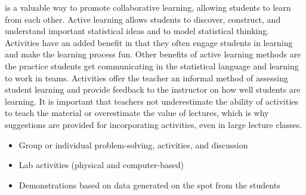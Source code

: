 \documentclass[twoside,openany]{tufte-book}
\begin{document}
 is a valuable way to promote collaborative learning, allowing students to learn from each other. Active learning allows students to discover, construct, and understand important statistical ideas and to model statistical thinking. Activities have an added benefit in that they often engage students in learning and make the learning process fun.  Other benefits of active learning methods are the practice students get communicating in the statistical language and learning to work in teams. Activities offer the teacher an informal method of assessing student learning and provide feedback to the instructor on how well students are learning. It is important that teachers not underestimate the ability of activities to teach the material or overestimate the value of lectures, which is why suggestions are provided for incorporating activities, even in large lecture classes.  \\
\vspace{.25in}
 
\noindent{}

\renewcommand\labelitemi{$\filledsquare$}

\begin{itemize}[leftmargin=1cm, itemsep=.2em]
\item Group or individual problem-solving, activities, and discussion
\item Lab activities (physical and computer-based)
\item Demonstrations based on data generated on the spot from the students
\end{itemize}
 
\renewcommand\labelitemi{$\checkmark$}
\end{document}
